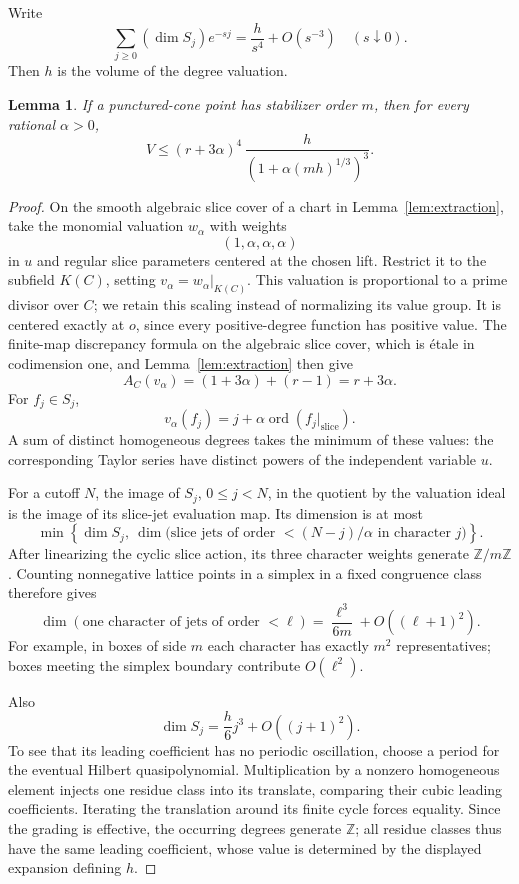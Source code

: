 \documentclass[11pt]{article}
\newtheorem{lemma}[theorem]{Lemma}
\theoremstyle{definition}
\theoremstyle{remark}
\numberwithin{equation}{section}
\newcommand{\Z}{\mathbb Z}
\newcommand{\ord}{\operatorname{ord}}
\begin{document}
Write
\[
\sum_{j\ge0}(\dim S_j)e^{-sj}=\frac h{s^4}+O(s^{-3})
\quad(s\downarrow0).
\]
Then \(h\) is the volume of the degree valuation.

\begin{lemma}\label{lem:jet}
If a punctured-cone point has stabilizer order \(m\), then for every rational \(\alpha>0\),
\begin{equation}\label{eq:jet-volume}
V\le
(r+3\alpha)^4\,\frac h{(1+\alpha(mh)^{1/3})^3}.
\end{equation}
\end{lemma}

\begin{proof}
On the smooth algebraic slice cover of a chart in Lemma~\ref{lem:extraction}, take the monomial valuation \(w_\alpha\) with weights
\[
(1,\alpha,\alpha,\alpha)
\]
in \(u\) and regular slice parameters centered at the chosen lift. Restrict it to the subfield \(K(C)\), setting \(v_\alpha=w_\alpha|_{K(C)}\). This valuation is proportional to a prime divisor over \(C\); we retain this scaling instead of normalizing its value group. It is centered exactly at \(o\), since every positive-degree function has positive value. The finite-map discrepancy formula on the algebraic slice cover, which is étale in codimension one, and Lemma~\ref{lem:extraction} then give
\[
A_C(v_\alpha)=(1+3\alpha)+(r-1)=r+3\alpha.
\]
For \(f_j\in S_j\),
\[
v_\alpha(f_j)=j+\alpha\ord(f_j|_{\mathrm{slice}}).
\]
A sum of distinct homogeneous degrees takes the minimum of these values: the corresponding Taylor series have distinct powers of the independent variable \(u\).

For a cutoff \(N\), the image of \(S_j\), \(0\le j<N\), in the quotient by the valuation ideal is the image of its slice-jet evaluation map. Its dimension is at most
\[
\min\!\left\{\dim S_j,\ 
\dim\bigl(\text{slice jets of order }<(N-j)/\alpha
\text{ in character }j\bigr)\right\}.
\]
After linearizing the cyclic slice action, its three character weights generate \(\Z/m\Z\). Counting nonnegative lattice points in a simplex in a fixed congruence class therefore gives
\begin{equation}\label{eq:jets}
\dim(\text{one character of jets of order }<\ell)
=\frac{\ell^3}{6m}+O((\ell+1)^2).
\end{equation}
For example, in boxes of side \(m\) each character has exactly \(m^2\) representatives; boxes meeting the simplex boundary contribute \(O(\ell^2)\).

Also
\begin{equation}\label{eq:hilbert-leading}
\dim S_j=\frac h6j^3+O((j+1)^2).
\end{equation}
To see that its leading coefficient has no periodic oscillation, choose a period for the eventual Hilbert quasipolynomial. Multiplication by a nonzero homogeneous element injects one residue class into its translate, comparing their cubic leading coefficients. Iterating the translation around its finite cycle forces equality. Since the grading is effective, the occurring degrees generate \(\Z\); all residue classes thus have the same leading coefficient, whose value is determined by the displayed expansion defining \(h\).


\end{proof}
\end{document}
